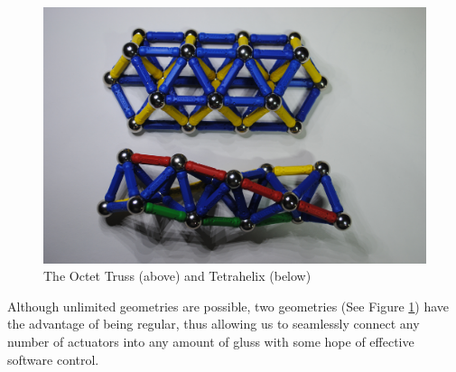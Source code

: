 \documentclass[11pt]{article}
\begin{document}
\begin{figure}[H]
  \centering
    \includegraphics[width=1.0\textwidth]{figures/TwoGeometries.jpg}
    \caption[The Octet Truss (above) and Tetrahelix (below)]{The Octet Truss (above) and Tetrahelix (below)}
      \label{twogeometries}
\end{figure}


Although unlimited geometries are possible, two geometries (See Figure \ref{twogeometries})
have the advantage of being regular, thus allowing us to
seamlessly connect any number of actuators into any amount of gluss with some hope of effective software control.
\end{document}
